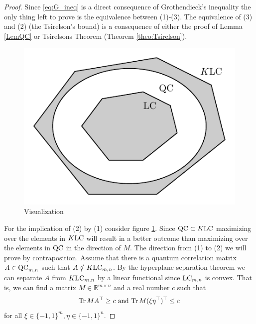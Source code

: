 	\begin{proof}
		Since \eqref{eq:G_ineq} is a direct consequence of Grothendieck's inequality the only thing left to prove is the equivalence between (1)-(3). The equivalence of (3) and (2) (the Tsirelson's bound) is a consequence of either the proof of Lemma \ref{LemQC} or Tsirelsons Theorem (Theorem \ref{theo:Tsirelson}).
		
		\begin{figure}
			\includegraphics[scale=1]{chapters/fig_QC&LC.pdf}
			\caption{Visualization } \label{fig:QCLC}
		\end{figure}
		
		For the implication of (2) by (1) consider figure \ref{fig:QCLC}. Since $\textup{QC}\subset K\textup{LC}$ maximizing over the elements in $K\textup{LC}$ will result in a better outcome than maximizing over the elements in $\textup{QC}$ in the direction of $M$.
		The direction from (1) to (2) we will prove by contraposition. Assume that there is a quantum correlation matrix $A\in\textup{QC}_{m,n}$ such that $A\notin K\textup{LC}_{m,n}$. By the hyperplane separation theorem we can separate $A$ from $K\textup{LC}_{m,n}$ by a linear functional since $\textup{LC}_{m,n}$ is convex. That is, we can find a matrix $M\in\mathbb{R}^{m\times n}$ and a real number $c$ such that 
		\begin{equation*}
			\textup{Tr} \, {MA^\top}  \geq c \text{ and } \textup{Tr} \, {M(\xi\eta^\top)^\top} \leq c
		\end{equation*}
		for all $\xi\in\{-1,1\}^m,\eta\in\{-1,1\}^n$.
	\end{proof}
\newpage